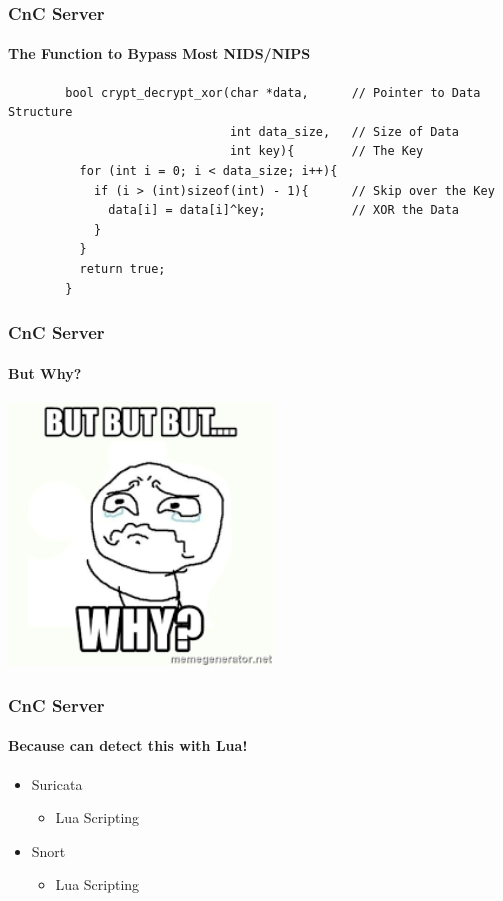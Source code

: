 \documentclass[aspectratio=169]{beamer}
\begin{document}
\begin{frame}[fragile]{}
  \frametitle{CnC Server}
  \framesubtitle{The Function to Bypass Most NIDS/NIPS}
  \begin{center}
    \begin{tcolorbox}[title=net.c,colback=black]
    \begin{minipage}{0.5\textwidth}
      \begin{verbatim}
        bool crypt_decrypt_xor(char *data,      // Pointer to Data Structure
                               int data_size,   // Size of Data
                               int key){        // The Key
          for (int i = 0; i < data_size; i++){ 
            if (i > (int)sizeof(int) - 1){      // Skip over the Key
              data[i] = data[i]^key;            // XOR the Data
            }
          }
          return true;
        }
      \end{verbatim}
    \end{minipage}
    \end{tcolorbox}
  \end{center}
\end{frame}

\begin{frame}
  \frametitle{CnC Server}
  \framesubtitle{But Why?}
  \begin{center}
    \includegraphics[width=7cm,keepaspectratio]{but_why}
  \end{center}
\end{frame}

\begin{frame}
  \frametitle{CnC Server}
  \framesubtitle{Because can detect this with Lua!}
  \begin{itemize}
  \item{Suricata}
    \begin{itemize}
    \item{Lua Scripting}
    \end{itemize}
  \item{Snort}
    \begin{itemize}
    \item{Lua Scripting}
    \end{itemize}
  \end{itemize}
\end{frame}
\end{document}
